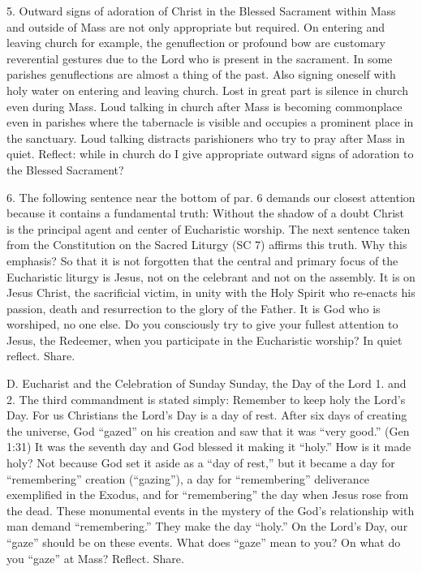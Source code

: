 \documentclass[oneside]{book}
\begin{document}
5. Outward signs of adoration of Christ in the Blessed Sacrament within Mass and
outside of Mass are not only appropriate but required. On entering and leaving
church for example, the genuflection or profound bow are customary reverential
gestures due to the Lord who is present in the sacrament. In some parishes
genuflections are almost a thing of the past. Also signing oneself with holy
water on entering and leaving church. Lost in great part is silence in church
even during Mass. Loud talking in church after Mass is becoming commonplace even
in parishes where the tabernacle is visible and occupies a prominent place in
the sanctuary. Loud talking distracts parishioners who try to pray after Mass in
quiet. Reflect: while in church do I give appropriate outward signs of adoration
to the Blessed Sacrament?

6. The following sentence near the bottom of par. 6 demands our closest
attention because it contains a fundamental truth: Without the shadow of a doubt
Christ is the principal agent and center of Eucharistic worship. The next
sentence taken from the Constitution on the Sacred Liturgy (SC 7) affirms this
truth. Why this emphasis? So that it is not forgotten that the central and
primary focus of the Eucharistic liturgy is Jesus, not on the celebrant and not
on the assembly. It is on Jesus Christ, the sacrificial victim, in unity with
the Holy Spirit who re-enacts his passion, death and resurrection to the glory
of the Father. It is God who is worshiped, no one else. Do you consciously try
to give your fullest attention to Jesus, the Redeemer, when you participate in
the Eucharistic worship? In quiet reflect. Share.

D. Eucharist and the Celebration of Sunday
Sunday, the Day of the Lord
1. and 2. The third commandment is stated simply: Remember to keep holy the
Lord's Day. For us Christians the Lord's Day is a day of rest. After six days of
creating the universe, God ``gazed'' on his creation and saw that it was ``very
good.'' (Gen 1:31) It was the seventh day and God blessed it making it ``holy.''
How is it made holy? Not because God set it aside as a ``day of rest,'' but it
became a day for ``remembering'' creation (``gazing''), a day for
``remembering'' deliverance exemplified in the Exodus, and for ``remembering''
the day when Jesus rose from the dead.
These monumental events in the mystery of the God's relationship with man demand
``remembering.'' They make the day ``holy.'' On the Lord's Day, our ``gaze''
should be on these events. What does ``gaze'' mean to you? On what do you
``gaze'' at Mass? Reflect. Share.
\end{document}
